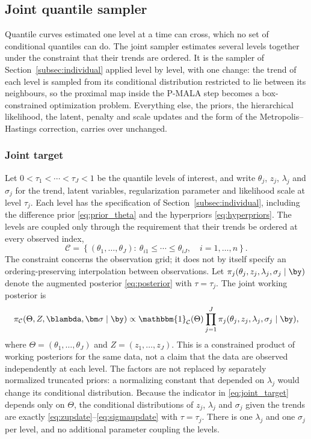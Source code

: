 \subsection{Joint quantile sampler}
\label{subsec:joint}

Quantile curves estimated one level at a time can cross, which no set of conditional quantiles can do. The joint sampler estimates several levels together under the constraint that their trends are ordered. It is the sampler of Section~\ref{subsec:individual} applied level by level, with one change: the trend of each level is sampled from its conditional distribution restricted to lie between its neighbours, so the proximal map inside the P-MALA step becomes a box-constrained optimization problem. Everything else, the priors, the hierarchical likelihood, the latent, penalty and scale updates and the form of the Metropolis--Hastings correction, carries over unchanged.

\subsubsection{Joint target}

Let $0 < \tau_1 < \cdots < \tau_J < 1$ be the quantile levels of interest, and write $\theta_j$, $z_j$, $\lambda_j$ and $\sigma_j$ for the trend, latent variables, regularization parameter and likelihood scale at level $\tau_j$. Each level has the specification of Section~\ref{subsec:individual}, including the difference prior \eqref{eq:prior_theta} and the hyperpriors \eqref{eq:hyperpriors}. The levels are coupled only through the requirement that their trends be ordered at every observed index,
\begin{equation}
    \mathcal C = \left\{(\theta_1,\ldots,\theta_J):\
    \theta_{i1} \leq \cdots \leq \theta_{iJ},\quad i=1,\ldots,n\right\}.
    \label{eq:joint_order}
\end{equation}
The constraint concerns the observation grid; it does not by itself specify an ordering-preserving interpolation between observations. Let $\pi_j(\theta_j,z_j,\lambda_j,\sigma_j\mid\by)$ denote the augmented posterior \eqref{eq:posterior} with $\tau=\tau_j$. The joint working posterior is
\begin{equation}
    \pi_{\mathcal C}(\Theta,Z,\blambda,\bm\sigma\mid\by)
    \propto \mathbbm{1}_{\mathcal C}(\Theta)
    \prod_{j=1}^J \pi_j(\theta_j,z_j,\lambda_j,\sigma_j\mid\by),
    \label{eq:joint_target}
\end{equation}
where $\Theta=(\theta_1,\ldots,\theta_J)$ and $Z=(z_1,\ldots,z_J)$. This is a constrained product of working posteriors for the same data, not a claim that the data are observed independently at each level. The factors are not replaced by separately normalized truncated priors: a normalizing constant that depended on $\lambda_j$ would change its conditional distribution. Because the indicator in \eqref{eq:joint_target} depends only on $\Theta$, the conditional distributions of $z_j$, $\lambda_j$ and $\sigma_j$ given the trends are exactly \eqref{eq:zupdate}--\eqref{eq:sigmaupdate} with $\tau = \tau_j$. There is one $\lambda_j$ and one $\sigma_j$ per level, and no additional parameter coupling the levels.

